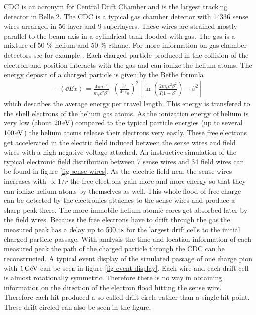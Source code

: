 CDC is an acronym for Central Drift Chamber and is the largest tracking detector in Belle 2. The CDC is a typical gas chamber detector with 14336 sense wires arranged in 56 layer and 9 superlayers. These wires are strained mostly parallel to the beam axis in a cylindrical tank flooded with gas. The gas is a mixture of 50 \% helium and 50 \% ethane. For more information on gas chamber detectors see for example \cite{grupen}.
Each charged particle produced in the collision of the electron and position interacts with the gas and can ionize the helium atoms. The energy deposit of a charged particle is given by the Bethe formula \cite{bethe}
\begin{align}
 - \left\langle \dd{E}{x} \right\rangle = \frac{4 \pi n z^2}{m_e c^2 \beta^2} \cdot \left( \frac{e^2}{4 \pi \varepsilon_0} \right)^2 \left[ \ln\left( \frac{2 m_e c^2 \beta^2}{I(1 - \beta^2} \right) - \beta^2 \right]
\end{align}
which describes the average energy per travel length. This energy is transfered to the shell electrons of the helium gas atoms. As the ionization energy of helium is very low (about $\unit[20]{eV}$) compared to the typical particle energies (up to several $\unit[100]{eV}$) the helium atoms release their electrons very easily. These free electrons get accelerated in the electric field induced between the sense wires and field wires with a high negative voltage attached. An instructive simulation of the typical electronic field distribution between 7 sense wires and 34 field wires can be found in figure \ref{fig-sense-wires}. As the electric field near the sense wires increases with $\propto 1/r$ the free electrons gain more and more energy so that they can ionize helium atoms by themselves as well. This whole flood of free charge can be detected by the electronics attaches to the sense wires and produce a sharp peak there. The more immobile helium atomic cores get absorbed later by the field wires. Because the free electrons have to drift through the gas the measured peak has a delay up to $\unit[500]{ns}$ for the largest drift cells to the initial charged particle passage. With analysis the time and location information of each measured peak the path of the charged particle through the CDC can be reconstructed. A typical event display of the simulated passage of one charge pion with $\unit[1]{GeV}$ can be seen in figure \ref{fig-event-display}. Each wire and each drift cell is almost rotationally symmetric. Therefore there is no way in obtaining information on the direction of the electron flood hitting the sense wire. Therefore each hit produced a so called drift circle rather than a single hit point. These drift circled can also be seen in the figure.

